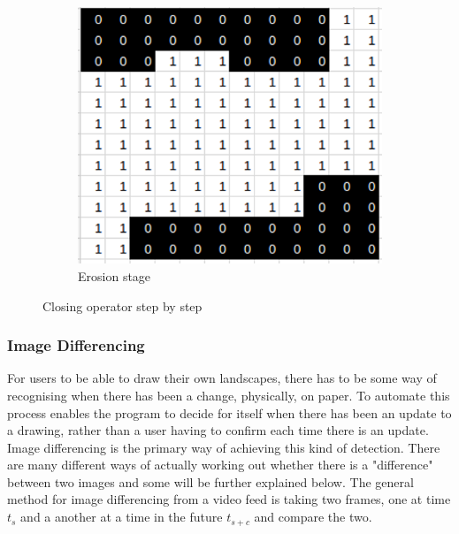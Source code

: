 \documentclass[11pt]{article}
\begin{document}
\begin{figure}[H]
	\hfill
	\begin{subfigure}{.32\textwidth}
		\centering
		\includegraphics[scale=0.27]{pics/closing_e}
		\caption{Erosion stage}
		\label{erosionstage}
	\end{subfigure}
	\caption{Closing operator step by step}
	\label{fig:closing}
\end{figure}

\subsubsection{Image Differencing}
For users to be able to draw their own landscapes, there has to be some way
of recognising when there has been a change, physically, on paper. To 
automate this process enables the program to decide for itself when
there has been an update to a drawing, rather than a user having 
to confirm each time there is an update. Image differencing is the 
primary way of achieving this kind of detection. There are many 
different ways of actually
working out whether there is a "difference" between two images and some will
be further explained below. The general method for image differencing from
a video feed is taking two frames, one at time $t_s$ and a another at a 
time in the future $t_{s+c}$ and compare the two.
\end{document}
